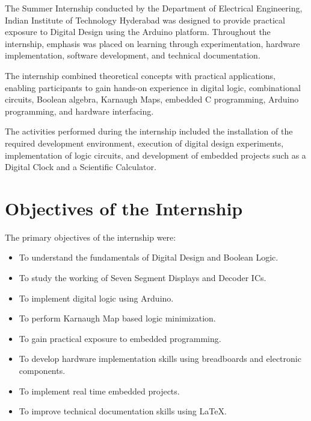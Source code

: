 \documentclass[12pt,a4paper]{report}
\begin{document}
The Summer Internship conducted by the Department of Electrical Engineering, Indian Institute of Technology Hyderabad was designed to provide practical exposure to Digital Design using the Arduino platform. Throughout the internship, emphasis was placed on learning through experimentation, hardware implementation, software development, and technical documentation.

The internship combined theoretical concepts with practical applications, enabling participants to gain hands-on experience in digital logic, combinational circuits, Boolean algebra, Karnaugh Maps, embedded C programming, Arduino programming, and hardware interfacing.

The activities performed during the internship included the installation of the required development environment, execution of digital design experiments, implementation of logic circuits, and development of embedded projects such as a Digital Clock and a Scientific Calculator.

\section{Objectives of the Internship}

The primary objectives of the internship were:

\begin{itemize}

\item To understand the fundamentals of Digital Design and Boolean Logic.

\item To study the working of Seven Segment Displays and Decoder ICs.

\item To implement digital logic using Arduino.

\item To perform Karnaugh Map based logic minimization.

\item To gain practical exposure to embedded programming.

\item To develop hardware implementation skills using breadboards and electronic components.

\item To implement real time embedded projects.

\item To improve technical documentation skills using \LaTeX.

\end{itemize}
\end{document}
